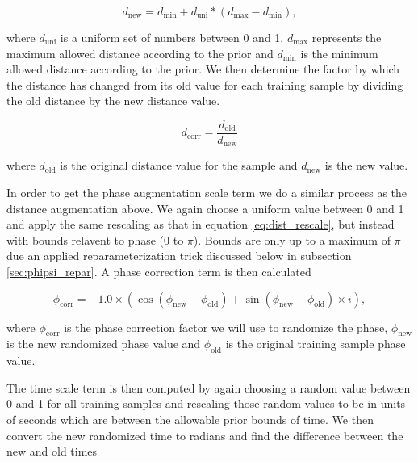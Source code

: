 \begin{equation}\label{eq:dist_rescale}
    d_{\textrm{new}} = d_{\textrm{min}} + d_{\textrm{uni}}*(d_{\textrm{max}} - d_{\textrm{min}}),
\end{equation}

where $d_{\textrm{uni}}$ is a uniform set of numbers between 0 and 1, 
$d_{\textrm{max}}$ represents the maximum allowed distance according to the prior and $d_{\textrm{min}}$ is the minimum allowed distance according to the prior. We then determine the factor by which the distance has changed from its old value for each training sample by dividing the old distance by the new distance value.

\begin{equation}
    d_{\textrm{corr}} = \frac{d_{\textrm{old}}}{d_{\textrm{new}}}
\end{equation}

where $d_{\textrm{old}}$ is the original distance value for the sample 
and $d_{\textrm{new}}$ is the new value. 

%
%

In order to get the phase augmentation scale term 
we do a similar process as the distance 
augmentation above. We again choose a uniform value between 0 and 1 and 
apply the same rescaling as that in equation \ref{eq:dist_rescale}, but 
instead with bounds relavent to phase (0 to $\pi$). Bounds are only 
up to a maximum of $\pi$ due an applied reparameterization trick 
discussed below in subsection \ref{sec:phipsi_repar}. A phase 
correction term is then calculated

\begin{equation}
    \phi_{\textrm{corr}} = -1.0 \times (\cos(\phi_{\textrm{new}} - \phi_{\textrm{old}}) + \sin(\phi_{\textrm{new}} - \phi_{\textrm{old}}) \times i),
\end{equation}

where $\phi_{\textrm{corr}}$ is the phase correction factor we 
will use to randomize the phase, $\phi_{\textrm{new}}$ is the new 
randomized phase value and $\phi_{\textrm{old}}$ is the original 
training sample phase value.

%
%

The time scale term is then computed by again choosing a random value 
between 0 and 1 for all training samples and rescaling those random 
values to be in units of seconds which are between the allowable 
prior bounds of time. We then convert the new randomized time 
to radians and find the difference between the new and old 
times

